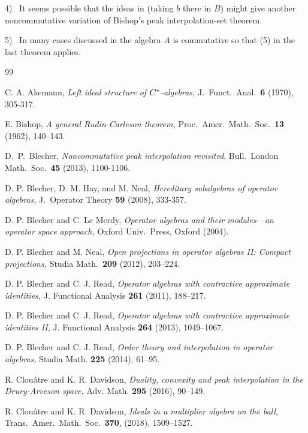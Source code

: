 \documentclass{amsart}
\theoremstyle{remark}
\theoremstyle{definition}
\numberwithin{equation}{section}
\begin{document}
4) \ It seems possible that the ideas in \cite[Corollary 5.4]{BRII} (taking $b$ there in $B$) might give another noncommutative   variation of Bishop's peak interpolation-set theorem.

5) \ In many cases discussed in \cite{CD,CD2,DH} the algebra $A$ is commutative so that (5) in the last theorem applies. 

\begin{thebibliography}{99}

    C. A. Akemann, {\em Left ideal structure of $C\sp*$-algebras,}  J.\ Funct.\ Anal.\ 
\textbf{6}  (1970), 305-317.

 E. Bishop, {\em A general Rudin-Carleson theorem,} Proc.\ Amer.\ Math.\ Soc.\ {\bf 13} (1962), 140--143. 

  D.\  P.\ Blecher, {\em Noncommutative peak interpolation
revisited}, Bull.\ London Math.\ Soc.\ {\bf 45} (2013),
1100-1106.

  D. P. Blecher, D. M. Hay, and
M. Neal, {\em Hereditary subalgebras of operator algebras,} J.\
Operator Theory {\bf 59} (2008), 333-357.

  D. P. Blecher
and C.  Le Merdy, {\em Operator algebras and their modules---an
operator space approach,} Oxford Univ.\  Press, Oxford (2004).


 D. P. Blecher and M. Neal, {\em Open projections in operator algebras II: Compact projections,} Studia Math.\ {\bf 209} (2012), 203--224.

\bibitem{BRI}  D. P. Blecher and C. J. Read, {\em  Operator algebras with contractive approximate identities,}
J. Functional Analysis {\bf 261} (2011), 188--217.

  D. P. Blecher and C. J. Read, {\em  Operator algebras with contractive approximate identities II,} J. Functional Analysis {\bf 264} (2013), 1049--1067.

\bibitem{BRord}  D. P. Blecher and C. J. Read, {\em   Order theory  and interpolation in operator algebras,}   Studia Math. {\bf 225} (2014), 61--95.

\bibitem{CD} R.  Clou\^atre and K. R. Davidson, {\em Duality, convexity and peak interpolation in the Drury-Arveson space,} Adv. Math. {\bf 295} (2016), 90--149.

\bibitem{CD2} R.  Clou\^atre and K. R. Davidson, {\em Ideals in a multiplier algebra on the ball}, Trans.\ Amer.\ Math.\ Soc.\  {\bf 370},
    (2018), 1509--1527. 


\end{thebibliography}
\end{document}
